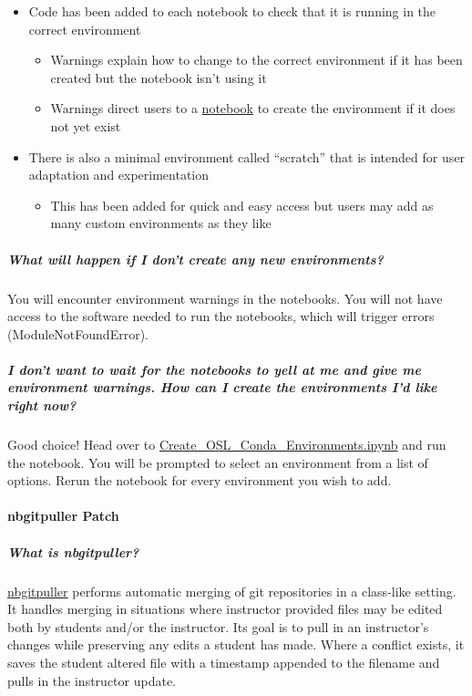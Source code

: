 \begin{itemize}
\item Code has been added to each notebook to check that it is running in the correct environment\begin{itemize}
\item Warnings explain how to change to the correct environment if it has been created but the notebook isn't using it
\item Warnings direct users to a \href{https://github.com/ASFOpenSARlab/opensarlab-envs/blob/main/Create\_OSL\_Conda\_Environments.ipynb}{notebook} to create the environment if it does not yet exist
\end{itemize}


\item There is also a minimal environment called ``scratch'' that is intended for user adaptation and experimentation\begin{itemize}
\item This has been added for quick and easy access but users may add as many custom environments as they like
\end{itemize}
\end{itemize}

\subparagraph{What will happen if I don't create any new environments?}

You will encounter environment warnings in the notebooks. You will not have access to the software needed to run the notebooks, which will trigger errors (ModuleNotFoundError).

\subparagraph{I don't want to wait for the notebooks to yell at me and give me environment warnings. How can I create the environments I'd like right now?}

Good choice! Head over to \href{https://github.com/ASFOpenSARlab/opensarlab-envs/blob/main/Create\_OSL\_Conda\_Environments.ipynb}{Create\_OSL\_Conda\_Environments.ipynb} and run the notebook. You will be prompted to select an environment from a list of options. Rerun the notebook for every environment you wish to add.

\paragraph{nbgitpuller Patch}

\subparagraph{What is nbgitpuller?}

\href{https://github.com/jupyterhub/nbgitpuller}{nbgitpuller} performs automatic merging of git repositories in a class-like setting. It handles merging in situations where instructor provided files may be edited both by students and/or the instructor. Its goal is to pull in an instructor's changes while preserving any edits a student has made. Where a conflict exists, it saves the student altered file with a timestamp appended to the filename and pulls in the instructor update.

